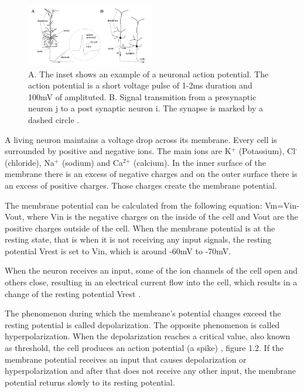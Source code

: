 
\begin{figure}[h!]
  \centering
    \centering
      \includegraphics[width=0.5\textwidth]{chapter2/dendrites.png}
  	\caption{A. The inset shows an example of a neuronal action 
		potential. 	The action potential is a short voltage pulse of 
		1-2ms duration and 100mV of amplituted. B. Signal 
		transmition from a presynaptic neuron j to a post synaptic 
		neuron i. The synapse is marked by a dashed circle \cite{gernstbook}.}
	\label{dendrites}
\end{figure}

A living neuron maintains a voltage drop across its membrane. Every cell is surrounded by positive and negative ions. The main ions are K$^{\textrm{+}}$ (Potassium), Cl$^{\textrm{-}}$ (chloride), Na$^{\textrm{+}}$ (sodium) and Ca$^{\textrm{2+}}$ (calcium). In the inner surface of the membrane there is an excess of negative charges and on the outer surface there is an excess of positive charges. Those charges create the membrane potential.

The membrane potential can be calculated from the following equation: Vm=Vin-Vout, where Vin is the negative charges on the inside of the cell and Vout are the positive charges outside of the cell.  When the membrane potential is at the resting state, that is when it is not receiving any input signals, the resting potential Vrest is set to Vin, which is around -60mV to -70mV.

When the neuron receives an input, some of the ion channels of the cell open and others close, resulting in an electrical current flow into the cell, which results in a change of the resting potential Vrest \cite{princNeuron}.

The phenomenon during which the membrane's potential changes exceed the resting potential is called depolarization. The opposite phenomenon is called hyperpolarization. When the depolarization reaches a critical value, also known as threshold, the cell produces an action potential (a spike) \cite{princNeuron}, figure 1.2. If the membrane potential receives an input that causes depolarization or hyperpolarization and after that does not receive any other input, the membrane potential returns slowly to its resting potential.

